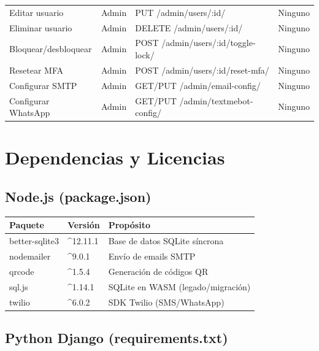 \documentclass[12pt,a4paper,openany]{article}
\begin{document}
\begin{table}[H]
\begin{tabular}{@{}p{4.5cm}p{3cm}p{3cm}p{3cm}@{}}
Editar usuario & Admin & PUT /admin/users/:id/ & Ninguno \\
Eliminar usuario & Admin & DELETE /admin/users/:id/ & Ninguno \\
Bloquear/desbloquear & Admin & POST /admin/users/:id/toggle-lock/ & Ninguno \\
Resetear MFA & Admin & POST /admin/users/:id/reset-mfa/ & Ninguno \\
Configurar SMTP & Admin & GET/PUT /admin/email-config/ & Ninguno \\
Configurar WhatsApp & Admin & GET/PUT /admin/textmebot-config/ & Ninguno \\
\bottomrule
\end{tabular}
\end{table}

\section{Dependencias y Licencias}

\subsection{Node.js (package.json)}

\begin{table}[H]
\centering
\begin{tabular}{@{}lll@{}}
\toprule
\textbf{Paquete} & \textbf{Versión} & \textbf{Propósito} \\
\midrule
better-sqlite3 & \textasciicircum12.11.1 & Base de datos SQLite síncrona \\
nodemailer & \textasciicircum9.0.1 & Envío de emails SMTP \\
qrcode & \textasciicircum1.5.4 & Generación de códigos QR \\
sql.js & \textasciicircum1.14.1 & SQLite en WASM (legado/migración) \\
twilio & \textasciicircum6.0.2 & SDK Twilio (SMS/WhatsApp) \\
\bottomrule
\end{tabular}
\end{table}

\subsection{Python Django (requirements.txt)}
\end{document}
